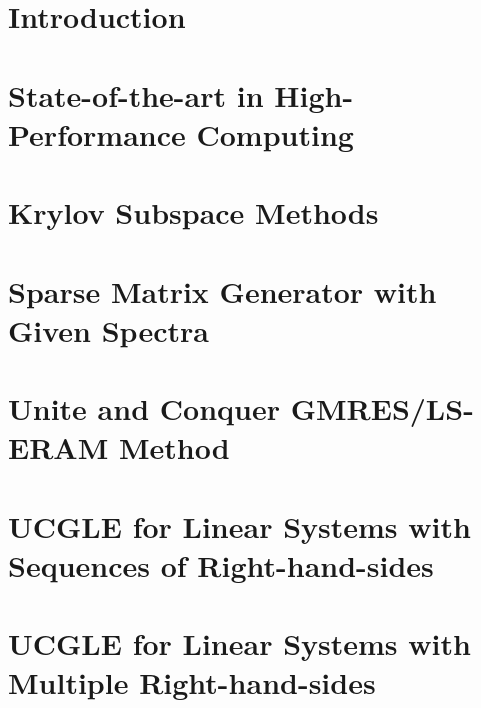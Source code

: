\documentclass{xinzhewu}
\begin{document}
{\small
\listofalgorithms
{}
}

\mainmatter %

\chapter{Introduction}



\chapter{State-of-the-art in High-Performance Computing} \label{State-of-the-art in High-Performance Computing}



\chapter{Krylov Subspace Methods}\label{Krylov Subspace Methods}



\chapter{Sparse Matrix Generator with Given Spectra}\label{Sparse Matrix Generator with Given Spectra}



\chapter[Unite and Conquer GMRES/LS-ERAM Method]{Unite and Conquer GMRES/LS-ERAM Method}\label{Unite and Conquer GMRES/LS-ERAM Method}



\chapter{UCGLE for Linear Systems with Sequences of Right-hand-sides}\label{UCGLE for Linear Systems with Sequences of Right-hand-sides}



\chapter{UCGLE for Linear Systems with Multiple Right-hand-sides} \label{UCGLE for Linear Systems with Multiple Right-hand-sides}
\end{document}
